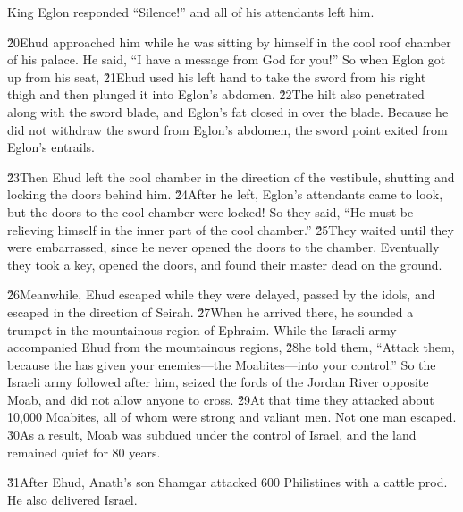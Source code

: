 King Eglon responded ``Silence!'' and all of his attendants left him.

\v{20}Ehud approached him while he was sitting by himself in the cool roof chamber of his palace. He said, ``I have a message from God for you!'' So when Eglon got up from his seat, \v{21}Ehud used his left hand to take the sword from his right thigh and then plunged it into Eglon's abdomen. \v{22}The hilt also penetrated along with the sword blade, and Eglon's fat closed in over the blade. Because he did not withdraw the sword from Eglon's abdomen, the sword point exited from Eglon's entrails.

\v{23}Then Ehud left the cool chamber in the direction of the vestibule, shutting and locking the doors behind him. \v{24}After he left, Eglon's attendants came to look, but the doors to the cool chamber were locked! So they said, ``He must be relieving himself in the inner part of the cool chamber.'' \v{25}They waited until they were embarrassed, since he never opened the doors to the chamber. Eventually they took a key, opened the doors, and found their master dead on the ground.

\v{26}Meanwhile, Ehud escaped while they were delayed, passed by the idols, and escaped in the direction of Seirah. \v{27}When he arrived there, he sounded a trumpet in the mountainous region of Ephraim. While the Israeli army accompanied Ehud from the mountainous regions, \v{28}he told them, ``Attack them, because the  has given your enemies---the Moabites---into your control.'' So the Israeli army followed after him, seized the fords of the Jordan River opposite Moab, and did not allow anyone to cross. \v{29}At that time they attacked about 10,000 Moabites, all of whom were strong and valiant men. Not one man escaped. \v{30}As a result, Moab was subdued under the control of Israel, and the land remained quiet for 80 years.

\v{31}After Ehud, Anath's son Shamgar attacked 600 Philistines with a cattle prod. He also delivered Israel.

